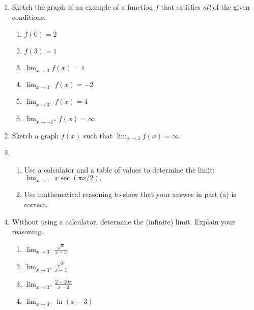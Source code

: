 \documentclass[11pt,fleqn]{article}
\begin{document}
\setlength{\parindent}{0cm}
\renewcommand{\headrulewidth}{0pt}
\newcommand{\blank}[1]{\rule{#1}{0.75pt}}
\renewcommand{\d}{\displaystyle}


\vspace*{-1in}
\begin{center}
\end{center}
\begin{enumerate}

\item Sketch the graph of an example of a function $f$ that satisfies \emph{all} of the given conditions.
	\begin{enumerate}
	\item $f(0)=2$
	\item $f(3)=1$
	\item $\d{\lim_{x \to 0}f(x)}=1$
	\item $\d{\lim_{x \to 3^-} f(x)= -2}$
	\item $\d{\lim_{x \to 3^+} f(x)= 4}$
	\item $\d{\lim_{x \to -1^+}f(x)= \infty}$
	\end{enumerate}
\vfill
\item Sketch a graph $f(x)$ such that $\d \lim_{x \to 3} f(x) = \infty.$ \vfill 

\item 
	\begin{enumerate}
	\item Use a calculator and a table of values to determine the limit: $\d{\lim_{x \to 1^-} x \sec(\pi x/2)}.$
	\vfill
	\item Use mathematical reasoning to show that your answer in part (a) is correct.
	\vfill
	\end{enumerate}

\newpage
\item Without using a calculator, determine the (infinite) limit. Explain your reasoning.
\begin{enumerate}
\item $\displaystyle{\lim_{x \to 3^-}\frac{\sqrt{x}}{x-3}}$\\
\vfill
\item $\displaystyle{\lim_{x \to 3^+}\frac{\sqrt{x}}{x-3}}$\\
\vfill

\item $\displaystyle{\lim_{x \to 3^+}\frac{{2-10x}}{x-3}}$\\
\vfill

\item $\displaystyle{\lim_{x \to 3^+}\ln(x-3)}$\\
\vfill


\end{enumerate}
\end{enumerate}
\end{document}
